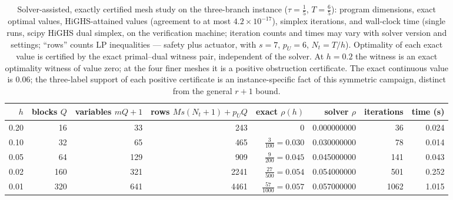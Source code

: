\documentclass[10pt,twocolumn]{article}
\theoremstyle{plain}
\theoremstyle{definition}
\theoremstyle{remark}
\begin{document}
\begin{table}[t]
\centering
\footnotesize
\begin{tabular}{@{}r|r|r|r|r|r|r|r@{}}
\toprule
\(h\) & blocks \(Q\) & variables \(mQ{+}1\) & rows \(Ms(N_t{+}1)+p_UQ\) & exact \(\rho(h)\) & solver \(\rho\) & iterations & time (s) \\
\midrule
0.20 & 16 & 33  & 243  & \(0\) & 0.000000000 & 36   & 0.024 \\
0.10 & 32 & 65  & 465  & \(\tfrac{3}{100} = 0.030\) & 0.030000000 & 78   & 0.014 \\
0.05 & 64 & 129 & 909  & \(\tfrac{9}{200} = 0.045\) & 0.045000000 & 141  & 0.043 \\
0.02 & 160 & 321 & 2241 & \(\tfrac{27}{500} = 0.054\) & 0.054000000 & 501  & 0.252 \\
0.01 & 320 & 641 & 4461 & \(\tfrac{57}{1000} = 0.057\) & 0.057000000 & 1062 & 1.015 \\
\bottomrule
\end{tabular}
\caption{Solver-assisted, exactly certified mesh study on the three-branch
instance (\(\tau = \tfrac15\), \(T = \tfrac65\)): program dimensions,
exact optimal values, HiGHS-attained values (agreement to at most
\(4.2 \times 10^{-17}\)), simplex iterations, and wall-clock time (single
runs, scipy HiGHS dual simplex, on the verification machine; iteration
counts and times may vary with solver version and settings; ``rows'' counts
LP inequalities --- safety plus actuator, with \(s = 7\), \(p_U = 6\),
\(N_t = T/h\)). Optimality of each exact value is certified by the exact
primal--dual witness pair, independent of the solver. At \(h = 0.2\) the
witness is an exact optimality witness of value zero; at the four finer
meshes it is a positive obstruction certificate. The exact continuous value
is \(0.06\); the three-label support of each positive certificate is an
instance-specific fact of this symmetric campaign, distinct from the
general \(r + 1\) bound.}
\label{tab:mesh}
\end{table}
\end{document}

